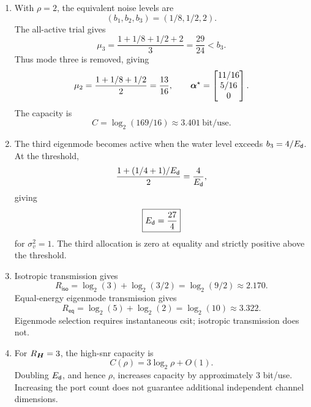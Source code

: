 \begin{enumerate}[label=\textbf{E\arabic*.}]
	\item With $\rho=2$, the equivalent noise levels are
	\begin{equation*}
		(b_1,b_2,b_3)=(1/8,1/2,2).
	\end{equation*}
	The all-active trial gives
	\begin{equation*}
		\mu_3=\frac{1+1/8+1/2+2}{3}
		=\frac{29}{24}<b_3.
	\end{equation*}
	Thus mode three is removed, giving
	\begin{equation*}
		\mu_2=\frac{1+1/8+1/2}{2}
		=\frac{13}{16},
		\qquad
		\bm{\alpha}^\star=
		\begin{bmatrix}11/16\\5/16\\0\end{bmatrix}.
	\end{equation*}
	The capacity is
	\begin{equation*}
		C=\log_2(169/16)
		\approx3.401\ \text{bit/use}.
	\end{equation*}
	
	\item The third eigenmode becomes active when the
	water level exceeds $b_3=4/E_{\mathsf{d}}$.
	At the threshold,
	\begin{equation*}
		\frac{1+(1/4+1)/E_{\mathsf{d}}}{2}
		=\frac{4}{E_{\mathsf{d}}},
	\end{equation*}
	giving
	\begin{equation*}
		\boxed{E_{\mathsf{d}}=\frac{27}{4}}
	\end{equation*}
	for $\sigma_v^2=1$.
	The third allocation is zero at equality and
	strictly positive above the threshold.
	
	\item Isotropic transmission gives
	\begin{equation*}
		R_{\mathsf{iso}}
		=\log_2(3)+\log_2(3/2)
		=\log_2(9/2)
		\approx2.170.
	\end{equation*}
	Equal-energy eigenmode transmission gives
	\begin{equation*}
		R_{\mathsf{eq}}
		=\log_2(5)+\log_2(2)
		=\log_2(10)
		\approx3.322.
	\end{equation*}
	Eigenmode selection requires instantaneous
	\ac{csit}; isotropic transmission does not.
	
	\item For $R_{\bm{H}}=3$, the high-\ac{snr} capacity is
	\begin{equation*}
		C(\rho)=3\log_2\rho+O(1).
	\end{equation*}
	Doubling $E_{\mathsf{d}}$, and hence $\rho$, increases
	capacity by approximately $3$ bit/use.
	Increasing the port count does not guarantee
	additional independent channel dimensions.
	

\end{enumerate}
